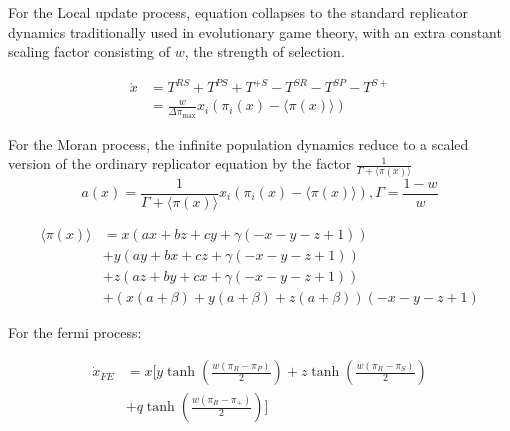 \documentclass[./main.tex]{subfiles}
\begin{document}
For the Local update process, equation
collapses to the standard replicator dynamics traditionally
used in evolutionary game theory, with an extra constant 
scaling factor consisting of $w$, the strength of 
selection.


\begin{align}
\dot{x} &= T^{RS} + T^{PS} + T^{+S} - T^{SR} - T^{SP} - T^{S+} \nonumber\\
&= \frac{w}{{\Delta \pi_\text{max}}} x_i(\pi_i(x) - \langle \pi(x)\rangle)
\end{align}




\par
For the Moran process, the infinite population dynamics reduce to a scaled version of the ordinary replicator equation by the factor $\frac{1}{\Gamma + \langle \pi(x) \rangle}$
\begin{equation}
 a(x) = \frac{1}{\Gamma + \langle \pi(x) \rangle} x_i(\pi_i(x) - \langle \pi(x) \rangle), \Gamma = \frac{1 - w}{w}
\end{equation}

\begin{equation} \nonumber
\begin{aligned}
\langle \pi(x) \rangle &= x \left(a x + b z + c y + \gamma \left(- x - y - z + 1\right)\right) \\
&+ y \left(a y + b x + c z + \gamma \left(- x - y - z + 1\right)\right) \\
&+ z \left(a z + b y + c x + \gamma \left(- x - y - z + 1\right)\right) \\
&+ \left(x \left(a + \beta\right) + y \left(a + \beta\right) + z \left(a + \beta\right)\right) \left(- x - y - z + 1\right)
\end{aligned}
\end{equation}



For the fermi process:

\begin{align}
\dot{x}_{FE} &= x \Big[
    y \tanh\!\left(\frac{w(\pi_R - \pi_P)}{2}\right)
  + z \tanh\!\left(\frac{w(\pi_R - \pi_S)}{2}\right)\nonumber \\
  &+ q \tanh\!\left(\frac{w(\pi_R - \pi_+)}{2}\right)
\Big]
\end{align}
\end{document}
